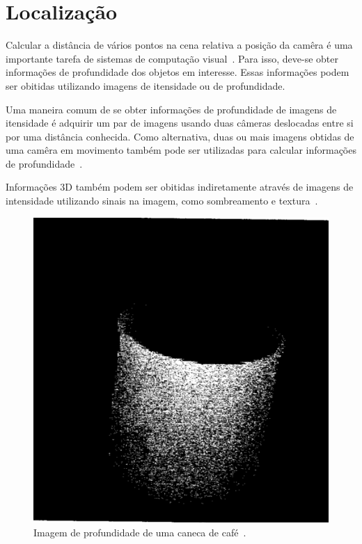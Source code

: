 \section{Localização}

	Calcular a distância de vários pontos na cena relativa a posição da camêra é uma importante tarefa de sistemas de computação visual~\cite{jain}. Para isso, deve-se obter informações de profundidade dos objetos em interesse. Essas informações podem ser obitidas utilizando imagens de itensidade ou de profundidade.

	Uma maneira comum de se obter informações de profundidade de imagens de itensidade é adquirir um par de imagens usando duas câmeras deslocadas entre si por uma distância conhecida. Como alternativa, duas ou mais imagens obtidas de uma camêra em movimento também pode ser utilizadas para calcular informações de profundidade~\cite{jain}.

	Informações 3D também podem ser obitidas indiretamente através de imagens de intensidade utilizando sinais na imagem, como sombreamento e textura~\cite{jain}.

	\begin{figure}[hbt]
		\begin{center}
			\includegraphics[scale=0.5]{figuras/2.FundamentacaoTeorica/depthimage.png}
		\end{center}
		\caption{Imagem de profundidade de uma caneca de café~\cite{jain}.}
		\label{depthimage}
	\end{figure}

